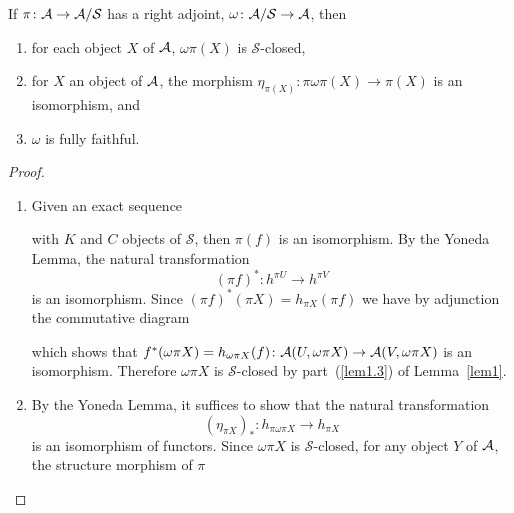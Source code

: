 \documentclass[dissertation.tex]{subfiles}
\begin{document}
\begin{lem}\label{lem4}
  If $\pi \colon \mathcal{A} \rightarrow \mathcal{A}/\mathcal{S}$ has a right adjoint, $\omega \colon \mathcal{A}/\mathcal{S} \rightarrow \mathcal{A}$, then
  \begin{enumerate}
  \item\label{lem4.1}
    for each object $X$ of $\mathcal{A}$, $\omega\pi(X)$ is $\mathcal{S}$-closed,
  \item\label{lem4.2}
    for $X$ an object of $\mathcal{A}$, the morphism $\eta_{\pi(X)} : \pi\omega\pi(X) \rightarrow \pi(X)$ is an isomorphism, and
  \item\label{lem4.3}
    $\omega$ is fully faithful.
  \end{enumerate}
  
  \begin{proof}
    \begin{enumerate}
    \item
      Given an exact sequence 
      \begin{center}
      \end{center}
      with $K$ and $C$ objects of $\mathcal{S}$, then $\pi(f)$ is an isomorphism.
      By the Yoneda Lemma, the natural transformation 
      $$(\pi{f})^\ast \colon h^{\pi{U}} \to h^{\pi{V}}$$
      is an isomorphism.
      Since $(\pi{f})^\ast(\pi{X}) = h_{\pi{X}}(\pi{f})$ we have by adjunction the commutative diagram
      \begin{center}
      \end{center}
      which shows that $f^\ast(\omega\pi X) = h_{\omega\pi{X}}(f) \colon \mathcal{A}(U, \omega\pi{X}) \to \mathcal{A}(V,\omega\pi{X})$ is an isomorphism.
      Therefore $\omega\pi{X}$ is $\mathcal{S}$-closed by part~(\ref{lem1.3}) of Lemma~\ref{lem1}.
    \item
      By the Yoneda Lemma, it suffices to show that the natural transformation
      $$(\eta_{\pi{X}})_\ast \colon h_{\pi\omega\pi{X}} \to h_{\pi{X}}$$
      is an isomorphism of functors.
      Since $\omega\pi{X}$ is $\mathcal{S}$-closed, for any object $Y$ of $\mathcal{A}$, the structure morphism of $\pi$

\end{enumerate}
\end{proof}
\end{lem}
\end{document}
